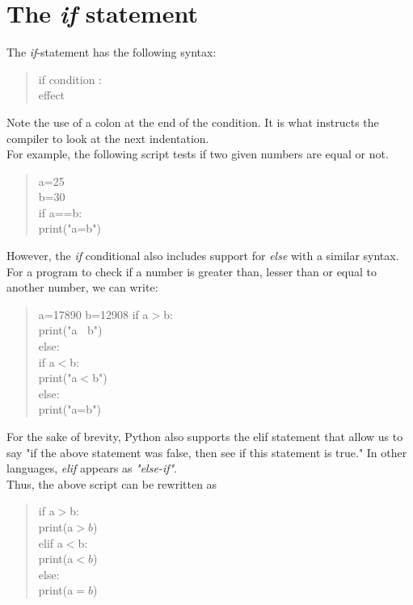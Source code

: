 \section{The \emph{if} statement}
The \emph{if}-statement has the following syntax:
\begin{quote}
if condition :\\
\tab effect
\end{quote}
Note the use of a colon at the end of the condition. It is what instructs the compiler to look at the next indentation.\\
For example,  the following script tests if two given numbers are equal or not.
\begin{quote}
a=25\\
b=30\\
if a==b:\\
\tab print("a=b")
\end{quote}
However, the \emph{if} conditional also includes support for \emph{else} with a similar syntax.\\
For a program to check if a number is greater than, lesser than or equal to another number, we can write:
\begin{quote}
a=17890
b=12908
if a$>$b:\\
\tab print("a $\>$ b")\\
else:\\ 
\tab if a$<$b:\\
\tab \tab print("a$<$b")\\
else:\\
\tab print("a=b")
\end{quote}
For the sake of brevity, Python also supports the elif statement that allow us to say "if the above statement was false, then see if this statement is true." In other languages, \emph{elif} appears as \emph{"else-if"}.\\
Thus, the above script can be rewritten as 
\begin{quote}
if a$>$b:\\
\tab print(a$>b$)\\
elif a$<$b:\\
\tab print(a$<b$)\\
else:\\
\tab print(a$=b$)
\end{quote}
